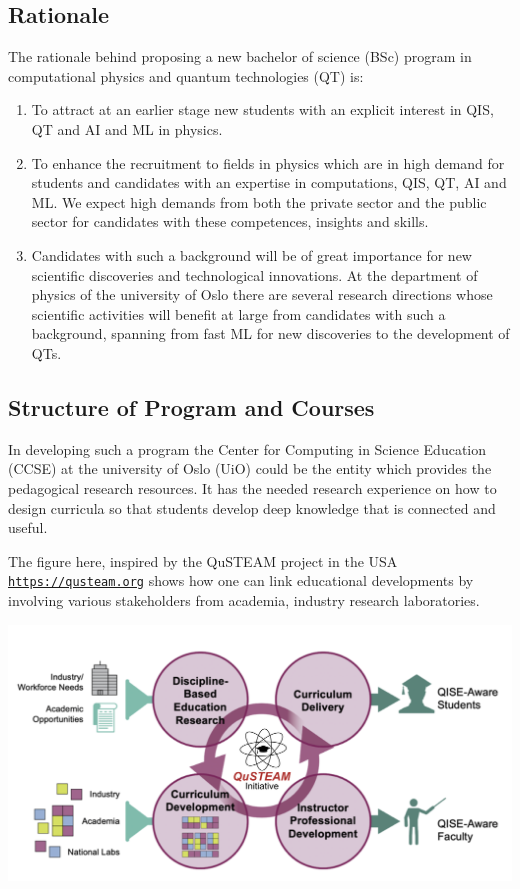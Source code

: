 \documentclass[%
oneside,                 %
final,                   %
10pt]{article}
\begin{document}
\subsection*{Rationale}

The rationale behind proposing a new bachelor of science (BSc) program in computational physics and quantum technologies (QT) is:
\begin{enumerate}
\item To attract at an earlier stage new students with an explicit interest in QIS, QT and AI and ML in physics. 

\item To enhance the recruitment to fields in physics which are in high demand for students and candidates with an expertise in computations, QIS, QT, AI and ML. We expect high demands from both the private sector and the public sector for candidates with these competences, insights and skills.

\item Candidates with such a background will be of great importance for new scientific discoveries and technological innovations. At the department of physics of the university of Oslo there are several research directions whose scientific activities will benefit at large from candidates with such a background, spanning from fast ML for new discoveries to the development of QTs.   
\end{enumerate}

\noindent
\subsection*{Structure of Program and Courses}

In developing such a program the Center for Computing in Science
Education (CCSE) at the university of Oslo (UiO) could be the entity
which provides the pedagogical research resources. It has the needed
research experience on how to design curricula so that students
develop deep knowledge that is connected and useful.

The figure here, inspired by the QuSTEAM project in the USA \href{{https://qusteam.org}}{\nolinkurl{https://qusteam.org}}
shows how one can link educational developments by involving various stakeholders from academia, industry research  laboratories. 

\vspace{6mm}

\centerline{\includegraphics[width=0.7\linewidth]{qusteam.png}}
\end{document}
